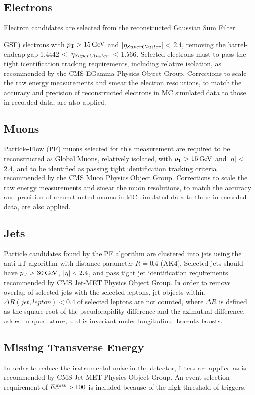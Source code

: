 \subsection{Electrons}
Electron candidates are selected from the reconstructed Gaussian Sum Filter {GSF) electrons with $\pT > \SI{15}{\GeV}$ and $\left\vert\eta_{SuperCluster}\right\vert<$ 2.4, removing the barrel-endcap gap 1.4442 $< \left\vert\eta_{SuperCluster}\right\vert<$ 1.566. 
Selected electrons must to pass the tight identification tracking requirements, including relative isolation, as recommended by the CMS EGamma Physics Object Group.
Corrections to scale the raw energy measurements and smear the electron resolutions, to match the accuracy and precision of reconstructed electrons in MC simulated data to those in recorded data, are also applied.
\subsection{Muons}
Particle-Flow (PF) muons selected for this measurement are required to be reconstructed as Global Muons, relatively isolated, with $\pT > \SI{15}{\GeV}$ and $\left\vert\eta\right\vert<$ 2.4, and to be identified as passing tight identification tracking criteria recommended by the CMS Muon Physics Object Group.
Corrections to scale the raw energy measurements and smear the muon resolutions, to match the accuracy and precision of reconstructed muons in MC simulated data to those in recorded data, are also applied.
\subsection{Jets}
Particle candidates found by the PF algorithm are clustered into jets using the anti-kT algorithm with distance parameter $R = 0.4$ (AK4). 
Selected jets should have $\pT > \SI{30}{\GeV}$, $\left\vert\eta\right\vert <2.4$, and pass tight jet identification requirements recommended by CMS Jet-MET Physics Object Group.
In order to remove overlap of selected jets with the selected leptons, jet objects within $\Delta R(jet,lepton) < 0.4$ of selected leptons are not counted, where $\Delta R$ is defined as the square root of the pseudorapidity difference and the azimuthal difference, added in quadrature, and is invariant under longitudinal Lorentz boosts.
\subsection{Missing Transverse Energy}
In order to reduce the instrumental noise in the detector, \MET filters are applied as is recommended by CMS Jet-MET Physics Object Group.
An event selection requirement of $E_{\mathrm{T}}^{\text{miss}} > 100$ is included because of the high threshold of \MET triggers.
}
